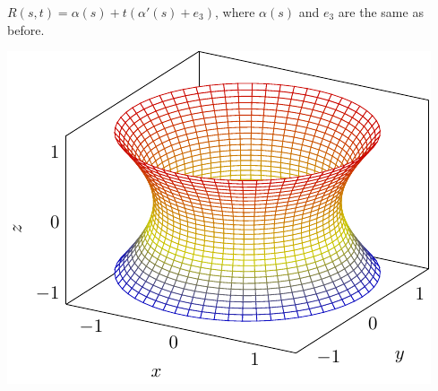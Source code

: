 \begin{example}\label{a ruled surface}
    \(R(s,t)=\alpha(s)+t\left(\alpha'(s)+e_3\right)\), where \(\alpha(s)\)
     and \(e_3\) are the same as before.
    \begin{center}
        \includegraphics{picture/week9/ruled surface-catenoid.pdf}

    \end{center}
\end{example}
